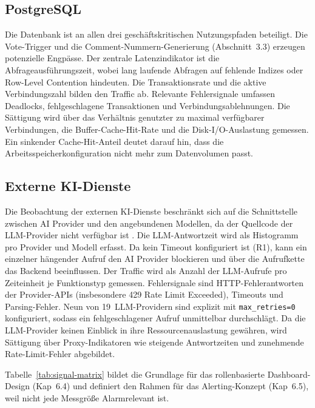  
\subsection{PostgreSQL}
\label{sec:gs-postgresql}
 
Die Datenbank ist an allen drei geschäftskritischen Nutzungspfaden beteiligt. Die Vote-Trigger und die Comment-Nummern-Generierung (Abschnitt~3.3) erzeugen potenzielle Engpässe. Der zentrale Latenzindikator ist die Abfrageausführungszeit, wobei lang laufende Abfragen auf fehlende Indizes oder Row-Level Contention hindeuten. Die Transaktionsrate und die aktive Verbindungszahl bilden den Traffic ab. Relevante Fehlersignale umfassen Deadlocks, fehlgeschlagene Transaktionen und Verbindungsablehnungen. Die Sättigung wird über das Verhältnis genutzter zu maximal verfügbarer Verbindungen, die Buffer-Cache-Hit-Rate und die Disk-I/O-Auslastung gemessen. Ein sinkender Cache-Hit-Anteil deutet darauf hin, dass die Arbeitsspeicherkonfiguration nicht mehr zum Datenvolumen passt.
 
 
\subsection{Externe KI-Dienste}
\label{sec:gs-ki}
 
Die Beobachtung der externen KI-Dienste beschränkt sich auf die Schnittstelle zwischen AI Provider und den angebundenen Modellen, da der Quellcode der LLM-Provider nicht verfügbar ist \parencite[S.~31]{bissig2024unified}. Die LLM-Antwortzeit wird als Histogramm pro Provider und Modell erfasst. Da kein Timeout konfiguriert ist (R1), kann ein einzelner hängender Aufruf den AI Provider blockieren und über die Aufrufkette das Backend beeinflussen. Der Traffic wird als Anzahl der LLM-Aufrufe pro Zeiteinheit je Funktionstyp gemessen. Fehlersignale sind HTTP-Fehlerantworten der Provider-APIs (insbesondere 429 Rate Limit Exceeded), Timeouts und Parsing-Fehler. Neun von 19~LLM-Providern sind explizit mit \texttt{max\_retries=0} konfiguriert, sodass ein fehlgeschlagener Aufruf unmittelbar durchschlägt. Da die LLM-Provider keinen Einblick in ihre Ressourcenauslastung gewähren, wird Sättigung über Proxy-Indikatoren wie steigende Antwortzeiten und zunehmende Rate-Limit-Fehler abgebildet.
 
Tabelle~\ref{tab:signal-matrix} bildet die Grundlage für das rollenbasierte Dashboard-Design (Kap~6.4) und definiert den Rahmen für das Alerting-Konzept (Kap~6.5), weil nicht jede Messgröße Alarmrelevant ist.
 
